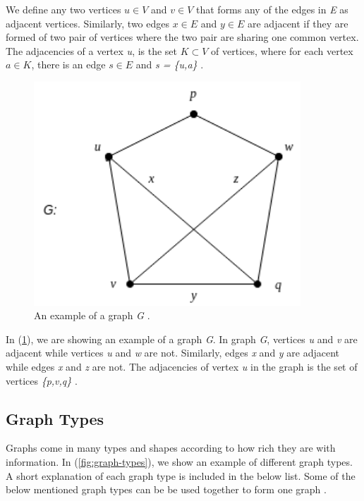 {We define any two vertices $u \in V$ and $v \in V$ that forms any of the edges in \textit{E} as adjacent vertices. Similarly, two edges $x \in E$ and $y \in E$ are adjacent if they are formed of two pair of vertices where the two pair are sharing one common vertex. The adjacencies of a vertex \textit{u}, is the set $K \subset V$ of vertices, where for each vertex $a \in K$, there is an edge \mbox{$s \in E$} and \textit{s = \{u,a\}} \cite{harary6graph}.

\begin{figure}
\centering
\includegraphics[width=10cm]{pics/Graph.png}
\caption{An example of a graph \textit{G} \cite{harary6graph}.}
\label{fig:graph}
\end{figure} 

In (\ref{fig:graph}), we are showing an example of a graph \textit{G}. In graph \textit{G}, vertices \textit{u} and \textit{v} are adjacent while vertices \textit{u} and \textit{w} are not. Similarly, edges \textit{x} and \textit{y} are adjacent while edges \textit{x} and \textit{z} are not. The adjacencies of vertex \textit{u} in the graph is the set of vertices \textit{\{p,v,q\}} \cite{harary6graph}.




\subsection{Graph Types}
\label{subsec:GraphTypes}

Graphs come in many types and shapes according to how rich they are with information. In (\ref{fig:graph-types}), we show an example of different graph types. A short explanation of each graph type is included in the below list. Some of the below mentioned graph types can be be used together to form one graph \cite{DBLP:journals/corr/abs-1006-2361}.
\\
\\

}
